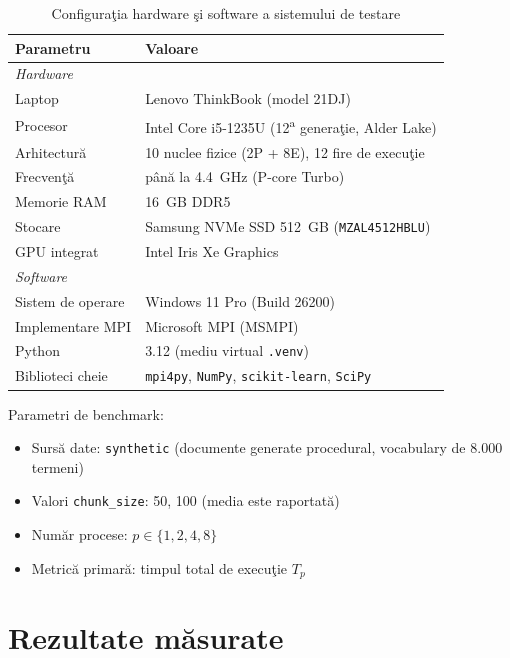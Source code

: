 \documentclass[a4paper,12pt]{report}
\begin{document}
\begin{table}[H]
\centering
\caption{Configura\c{t}ia hardware \c{s}i software a sistemului de testare}
\begin{tabular}{ll}
\toprule
\textbf{Parametru} & \textbf{Valoare} \\
\midrule
\multicolumn{2}{l}{\textit{Hardware}} \\
\midrule
Laptop              & Lenovo ThinkBook (model 21DJ) \\
Procesor            & Intel Core i5-1235U (12\textsuperscript{a} genera\c{t}ie, Alder Lake) \\
Arhitectur\u{a}    & 10 nuclee fizice (2P + 8E), 12 fire de execu\c{t}ie \\
Frecven\c{t}\u{a}  & p\^{a}n\u{a} la 4.4~GHz (P-core Turbo) \\
Memorie RAM         & 16~GB DDR5 \\
Stocare             & Samsung NVMe SSD 512~GB (\texttt{MZAL4512HBLU}) \\
GPU integrat        & Intel Iris Xe Graphics \\
\midrule
\multicolumn{2}{l}{\textit{Software}} \\
\midrule
Sistem de operare   & Windows 11 Pro (Build 26200) \\
Implementare MPI    & Microsoft MPI (MSMPI) \\
Python              & 3.12 (mediu virtual \texttt{.venv}) \\
Biblioteci cheie    & \texttt{mpi4py}, \texttt{NumPy}, \texttt{scikit-learn}, \texttt{SciPy} \\
\bottomrule
\end{tabular}
\label{tab:config}
\end{table}

\noindent Parametri de benchmark:
\begin{itemize}
  \item Surs\u{a} date: \texttt{synthetic} (documente generate procedural, vocabulary de 8.000 termeni)
  \item Valori \texttt{chunk\_size}: 50, 100 (media este raportat\u{a})
  \item Num\u{a}r procese: $p \in \{1, 2, 4, 8\}$
  \item Metric\u{a} primar\u{a}: timpul total de execu\c{t}ie $T_p$
\end{itemize}

\section{Rezultate m\u{a}surate}
\end{document}
